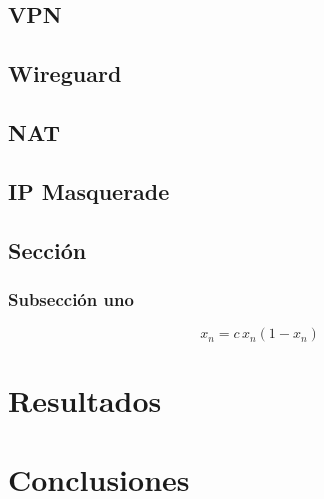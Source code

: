 \documentclass[letterpaper,12pt,oneside]{book}
\begin{document}
\section{VPN} %
\section{Wireguard} %

\section{NAT} %
\section{IP Masquerade} %

  

\section{Sección}
    
    \subsection{Subsecci\'on uno}
    \begin{equation}
    	x_n = c \, x_n(1 - x_n)
    	\label{Ec:logis}
    \end{equation}

\chapter{Resultados}  %

\chapter{Conclusiones}  %

%
%

\backmatter%
\end{document}
